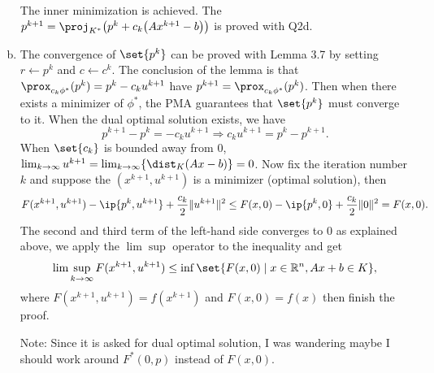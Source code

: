 \documentclass{article}
\begin{document}
\begin{solution}
\begin{enumerate}[(a)]
{\begin{align*}
            \end{align*}
            The inner minimization is achieved.
            The $p^{k+1} = \proj_{K^*}\parens*{p^k+c_k\parens*{Ax^{k+1}-b}}$ is proved with Q2d.
        }
        \item The convergence of $\set{p^k}$ can be proved with Lemma 3.7 by setting $r\leftarrow p^k$ and $c\leftarrow c^k$. The conclusion of the lemma is that $\prox_{c_k\phi^*}(p^k)=p^k-c_ku^{k+1}$ have $p^{k+1}=\prox_{c_k\phi^*}(p^k)$. Then when there exists a minimizer of $\phi^*$, the PMA guarantees that $\set{p^k}$ must converge to it. When the dual optimal solution exists, we have
        \[p^{k+1}-p^k=-c_ku^{k+1}\Rightarrow c_ku^{k+1}=p^k-p^{k+1}.\]
        When $\set{c_k}$ is bounded away from $0$, $\lim_{k\rightarrow\infty}u^{k+1}=\lim_{k\rightarrow\infty}\braces*{\dist_K(Ax-b)}=0$. Now fix the iteration number $k$ and suppose the $(x^{k+1},u^{k+1})$ is a minimizer (optimal solution), then
        \[F(x^{k+1}, u^{k+1})-\ip{p^k, u^{k+1}}+\frac{c_k}{2}\norm{u^{k+1}}^2\leq F(x, 0)-\ip{p^k, 0}+\frac{c_k}{2}\norm{0}^2=F(x,0).\]
        The second and third term of the left-hand side converges to $0$ as explained above, we apply the $\lim\sup$ operator to the inequality and get
        \[\lim\sup_{k\rightarrow\infty}F(x^{k+1},u^{k+1})\leq\inf\set{F(x,0)\mid x\in\R^n, Ax+b\in K},\]
        where $F(x^{k+1},u^{k+1})=f(x^{k+1})$ and $F(x,0)=f(x)$ then finish the proof.

        Note: Since it is asked for dual optimal solution, I was wandering maybe I should work around $F^*(0,p)$ instead of $F(x,0)$.
    \end{enumerate}
\end{solution}
\end{document}
